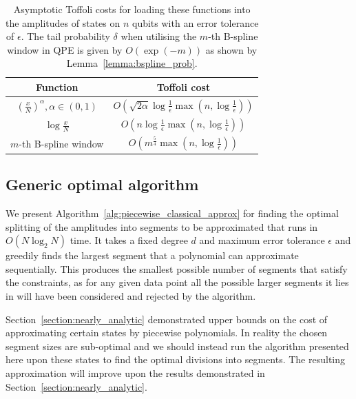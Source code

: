\begin{table}[hbtp]
            \centering
            
            \begin{tabular}{|c|c|}
            \hline
            Function & Toffoli cost \\ \hline\hline
                \rule{0pt}{1.25em}$\left(\frac{x}{N}\right)^{\alpha}, \alpha \in (0,1)$ &  $O\left(\sqrt{2\alpha} \log \frac{1}{\epsilon}\max(n, \log\frac{1}{\epsilon})\right)$ \\[0.5em] \hline
                \rule{0pt}{1.25em}$\log \frac{x}{N}$ &  $O\left(n\log \frac{1}{\epsilon}\max(n, \log\frac{1}{\epsilon})\right)$ \\[0.5em] \hline
                \rule{0pt}{1.25em}$m$-th B-spline window & $O\left(m^{\frac{5}{4}}\max \left(n, \log \frac{1}{\epsilon}\right)\right)$ \\[0.5em] \hline
            \end{tabular}
            
            \caption{\label{tab:resource_costs}Asymptotic Toffoli costs for loading these functions into the amplitudes of states on $n$ qubits with an error tolerance of $\epsilon$. The tail probability $\delta$ when utilising the $m$-th B-spline window in QPE is given by $O(\exp (-m))$ as shown by Lemma~\ref{lemma:bspline_prob}.}
        \end{table}

\subsection{Generic optimal algorithm}
\label{section:piecewise_algorithm}
We present Algorithm~\ref{alg:piecewise_classical_approx} for finding the optimal splitting of the amplitudes into segments to be approximated that runs in $O(N \log_2 N)$ time. It takes a fixed degree $d$ and maximum error tolerance $\epsilon$ and greedily finds the largest segment that a polynomial can approximate sequentially. This produces the smallest possible number of segments that satisfy the constraints, as for any given data point all the possible larger segments it lies in will have been considered and rejected by the algorithm. 

Section~\ref{section:nearly_analytic} demonstrated upper bounds on the cost of approximating certain states by piecewise polynomials. In reality the chosen segment sizes are sub-optimal and we should instead run the algorithm presented here upon these states to find the optimal divisions into segments. The resulting approximation will improve upon the results demonstrated in Section~\ref{section:nearly_analytic}. 

